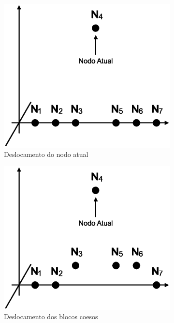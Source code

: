 \begin{figure}
	\begin{subfigure}{.5\textwidth}
  		\centering
  		\includegraphics[width=.9\linewidth]{figuras/nodos1.eps}
  		\caption{Deslocamento do nodo atual}
  		\label{fig:subnodos1}
	\end{subfigure}
	\begin{subfigure}{.5\textwidth}
  		\centering
  		\includegraphics[width=.9\linewidth]{figuras/nodos2.eps}
  		\caption{Deslocamento dos blocos coesos}
  		\label{fig:subnodos2}
	\end{subfigure}
	\begin{subfigure}{.5\textwidth}

\end{subfigure}
\end{figure}
